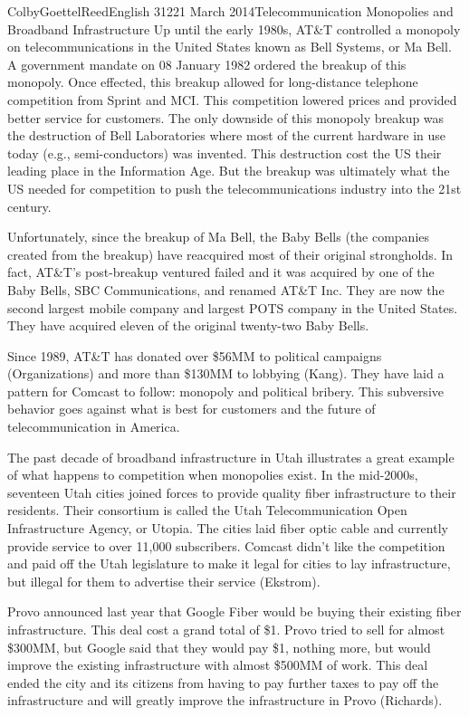 \documentclass[12pt]{article}
\begin{document}
\begin{mla}{Colby}{Goettel}{Reed}{English 312}{21 March 2014}{Telecommunication Monopolies and Broadband Infrastructure}
Up until the early 1980s, AT\&T controlled a monopoly on telecommunications in the United States known as Bell Systems, or Ma Bell. A government mandate on 08 January 1982 ordered the breakup of this monopoly. Once effected, this breakup allowed for long-distance telephone competition from Sprint and MCI. This competition lowered prices and provided better service for customers. The only downside of this monopoly breakup was the destruction of Bell Laboratories where most of the current hardware in use today (e.g., semi-conductors) was invented. This destruction cost the US their leading place in the Information Age. But the breakup was ultimately what the US needed for competition to push the telecommunications industry into the 21st century.

Unfortunately, since the breakup of Ma Bell, the Baby Bells (the companies created from the breakup) have reacquired most of their original strongholds. In fact, AT\&T's post-breakup ventured failed and it was acquired by one of the Baby Bells, SBC Communications, and renamed AT\&T Inc. They are now the second largest mobile company and largest POTS company in the United States. They have acquired eleven of the original twenty-two Baby Bells.

Since 1989, AT\&T has donated over \$56MM to political campaigns (Organizations) and more than \$130MM to lobbying (Kang). They have laid a pattern for Comcast to follow: monopoly and political bribery. This subversive behavior goes against what is best for customers and the future of telecommunication in America.

The past decade of broadband infrastructure in Utah illustrates a great example of what happens to competition when monopolies exist. In the mid-2000s, seventeen Utah cities joined forces to provide quality fiber infrastructure to their residents. Their consortium is called the Utah Telecommunication Open Infrastructure Agency, or Utopia. The cities laid fiber optic cable and currently provide service to over 11,000 subscribers. Comcast didn't like the competition and paid off the Utah legislature to make it legal for cities to lay infrastructure, but illegal for them to advertise their service (Ekstrom).

Provo announced last year that Google Fiber would be buying their existing fiber infrastructure. This deal cost a grand total of \$1. Provo tried to sell for almost \$300MM, but Google said that they would pay \$1, nothing more, but would improve the existing infrastructure with almost \$500MM of work. This deal ended the city and its citizens from having to pay further taxes to pay off the infrastructure and will greatly improve the infrastructure in Provo (Richards).


\end{mla}
\end{document}
